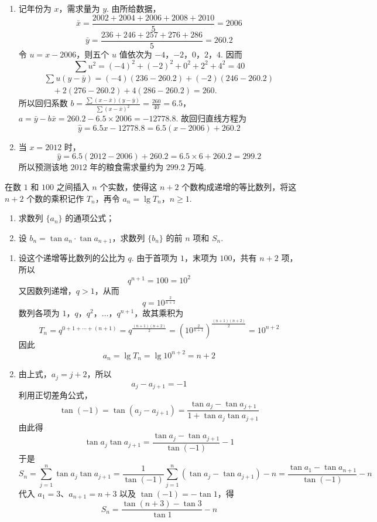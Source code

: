 \begin{solution}
\begin{enumerate}
\item 记年份为 \(x\)，需求量为 \(y\). 由所给数据，
\[
\bar{x}=\frac{2002+2004+2006+2008+2010}{5}=2006
\]
\[
\bar{y}=\frac{236+246+257+276+286}{5}=260.2
\]
令 \(u=x-2006\)，则五个 \(u\) 值依次为 \(-4\)，\(-2\)，\(0\)，\(2\)，\(4\). 因而
\[
\sum u^{2}=(-4)^{2}+(-2)^{2}+0^{2}+2^{2}+4^{2}=40
\]
\[
\begin{gathered}
\sum u(y-\bar y)=(-4)(236-260.2)+(-2)(246-260.2)\\
\quad+2(276-260.2)+4(286-260.2)=260.
\end{gathered}
\]
所以回归系数
\(b=\frac{\sum (x-\bar x)(y-\bar y)}{\sum (x-\bar x)^{2}}=\frac{260}{40}=6.5\)，\(a=\bar y-b\bar x=260.2-6.5\times2006=-12778.8\).
故回归直线方程为
\[
\hat y=6.5x-12778.8=6.5(x-2006)+260.2
\]

\item 当 \(x=2012\) 时，
\[
\hat y=6.5(2012-2006)+260.2=6.5\times6+260.2=299.2
\]
所以预测该地 \(2012\) 年的粮食需求量约为 \(299.2\text{ 万吨}\).
\end{enumerate}
\end{solution}

\begin{problem}
在数 \(1\) 和 \(100\) 之间插入 \(n\) 个实数，使得这 \(n + 2\) 个数构成递增的等比数列，将这 \(n + 2\) 个数的乘积记作 \(T_{n}\)，再令 \(a_{n} = \lg T_{n}\)，\(n \geqslant 1\).
\begin{enumerate}
\item 求数列 \(\{a_{n}\}\) 的通项公式；
\item 设 \(b_{n} = \tan a_{n} \cdot \tan a_{n+1}\)，求数列 \(\{b_{n}\}\) 的前 \(n\) 项和 \(S_{n}\).
\end{enumerate}
\end{problem}

\begin{solution}
\begin{enumerate}
\item 设这个递增等比数列的公比为 \(q\). 由于首项为 \(1\)，末项为 \(100\)，共有 \(n+2\) 项，所以
\[
q^{n+1}=100=10^{2}
\]
又因数列递增，\(q>1\)，从而
\[
q=10^{\frac{2}{n+1}}
\]
数列各项为 \(1\)，\(q\)，\(q^{2}\)，\(\ldots\)，\(q^{n+1}\)，故其乘积为
\[
T_n=q^{0+1+\cdots+(n+1)}=q^{\frac{(n+1)(n+2)}{2}}
=\left(10^{\frac{2}{n+1}}\right)^{\frac{(n+1)(n+2)}{2}}=10^{n+2}
\]
因此
\[
a_n=\lg T_n=\lg 10^{n+2}=n+2
\]

\item 由上式，\(a_j=j+2\)，所以
\[
a_j-a_{j+1}=-1
\]
利用正切差角公式，
\[
\tan(-1)=\tan(a_j-a_{j+1})
=\frac{\tan a_j-\tan a_{j+1}}{1+\tan a_j\tan a_{j+1}}
\]
由此得
\[
\tan a_j\tan a_{j+1}
=\frac{\tan a_j-\tan a_{j+1}}{\tan(-1)}-1
\]
于是
\[
S_n=\sum_{j=1}^{n}\tan a_j\tan a_{j+1}=\frac{1}{\tan(-1)}\sum_{j=1}^{n}(\tan a_j-\tan a_{j+1})-n=\frac{\tan a_1-\tan a_{n+1}}{\tan(-1)}-n
\]
代入 \(a_1=3\)、\(a_{n+1}=n+3\) 以及 \(\tan(-1)=-\tan1\)，得
\[
S_n=\frac{\tan(n+3)-\tan3}{\tan1}-n
\]
\end{enumerate}
\end{solution}
